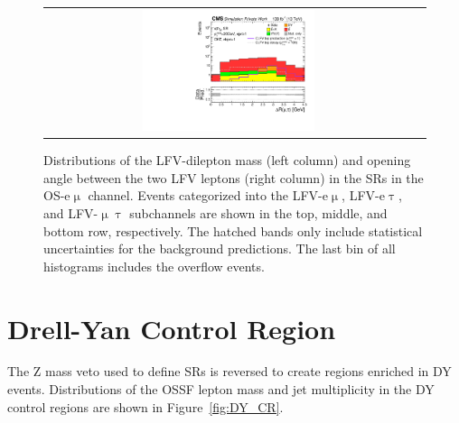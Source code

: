 \begin{figure}[tbh!]
\begin{center}
\begin{tabular}{cc}
 \includegraphics[width=0.48\textwidth]{figures/Part4/Evt/LFVmutaDr}\\
 \end{tabular}
 \caption{Distributions of the LFV-dilepton mass (left column) and opening angle between the two LFV leptons (right column) in the \acp{SR} in the \ac{OS}-e$\upmu$ channel. Events categorized into the LFV-e$\upmu$, LFV-e$\uptau$, and LFV-$\upmu\uptau$ subchannels are shown in the top, middle, and bottom row, respectively. The hatched bands only include statistical uncertainties for the background predictions. The last bin of all histograms includes the overflow events.}
 \label{fig:LFVmass}
 \end{center}
 \end{figure}

\section{Drell-Yan Control Region}
\label{sec:DY_CR}

The Z mass veto used to define \acp{SR} is reversed to create regions enriched in \ac{DY} events. Distributions of the \ac{OSSF} lepton mass and jet multiplicity in the \ac{DY} control regions are shown in Figure~\ref{fig:DY_CR}.

